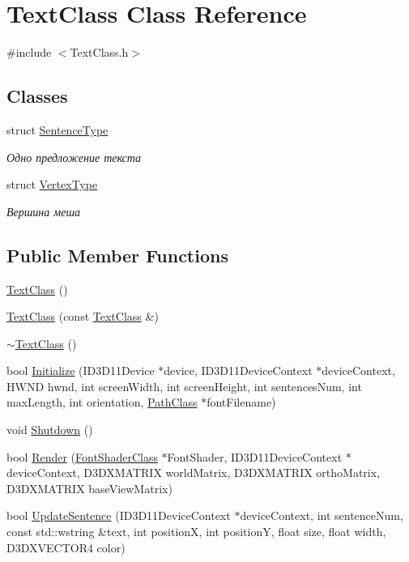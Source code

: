 \hypertarget{class_text_class}{}\section{Text\+Class Class Reference}
\label{class_text_class}


{\ttfamily \#include $<$Text\+Class.\+h$>$}

\subsection*{Classes}
\begin{DoxyCompactItemize}
\item 
struct \hyperlink{struct_text_class_1_1_sentence_type}{Sentence\+Type}
\begin{DoxyCompactList}\small\item\em Одно предложение текста \end{DoxyCompactList}\item 
struct \hyperlink{struct_text_class_1_1_vertex_type}{Vertex\+Type}
\begin{DoxyCompactList}\small\item\em Вершина меша \end{DoxyCompactList}\end{DoxyCompactItemize}
\subsection*{Public Member Functions}
\begin{DoxyCompactItemize}
\item 
\hyperlink{class_text_class_a0e96e63bbc5b8daaff57f836852532df}{Text\+Class} ()
\item 
\hyperlink{class_text_class_ac83be4860da5842fe856495ef79d067f}{Text\+Class} (const \hyperlink{class_text_class}{Text\+Class} \&)
\item 
\hyperlink{class_text_class_a4abf419d6357da79d5e1e6a5eb64e13e}{$\sim$\+Text\+Class} ()
\item 
bool \hyperlink{class_text_class_a57bdd7bee493f4d0f6a9e95e69250b8a}{Initialize} (I\+D3\+D11\+Device $\ast$device, I\+D3\+D11\+Device\+Context $\ast$device\+Context, H\+W\+ND hwnd, int screen\+Width, int screen\+Height, int sentences\+Num, int max\+Length, int orientation, \hyperlink{class_path_class}{Path\+Class} $\ast$font\+Filename)
\item 
void \hyperlink{class_text_class_a8cdd905013aaffc2331823de1245c658}{Shutdown} ()
\item 
bool \hyperlink{class_text_class_a23a01ed11cdc36c9b42185c41fa25d05}{Render} (\hyperlink{class_font_shader_class}{Font\+Shader\+Class} $\ast$Font\+Shader, I\+D3\+D11\+Device\+Context $\ast$device\+Context, D3\+D\+X\+M\+A\+T\+R\+IX world\+Matrix, D3\+D\+X\+M\+A\+T\+R\+IX ortho\+Matrix, D3\+D\+X\+M\+A\+T\+R\+IX base\+View\+Matrix)
\item 
bool \hyperlink{class_text_class_a16f624a1f7c3a43ab52be4a2ea592a5a}{Update\+Sentence} (I\+D3\+D11\+Device\+Context $\ast$device\+Context, int sentence\+Num, const std\+::wstring \&text, int positionX, int positionY, float size, float width, D3\+D\+X\+V\+E\+C\+T\+O\+R4 color)
\end{DoxyCompactItemize}
